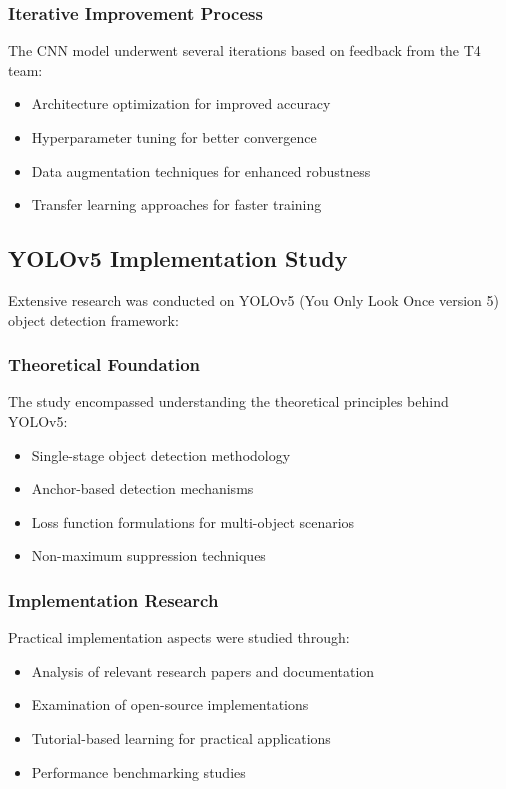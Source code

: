 \documentclass{book}
\begin{document}
\subsubsection{Iterative Improvement Process}
\par\noindent The CNN model underwent several iterations based on feedback from the T4 team:

\begin{itemize}
\item Architecture optimization for improved accuracy
\item Hyperparameter tuning for better convergence
\item Data augmentation techniques for enhanced robustness
\item Transfer learning approaches for faster training
\end{itemize}

\subsection{YOLOv5 Implementation Study}
\par\noindent Extensive research was conducted on YOLOv5 (You Only Look Once version 5) object detection framework:

\subsubsection{Theoretical Foundation}
\par\noindent The study encompassed understanding the theoretical principles behind YOLOv5:

\begin{itemize}
\item Single-stage object detection methodology
\item Anchor-based detection mechanisms
\item Loss function formulations for multi-object scenarios
\item Non-maximum suppression techniques
\end{itemize}

\subsubsection{Implementation Research}
\par\noindent Practical implementation aspects were studied through:

\begin{itemize}
\item Analysis of relevant research papers and documentation
\item Examination of open-source implementations
\item Tutorial-based learning for practical applications
\item Performance benchmarking studies
\end{itemize}
\end{document}
